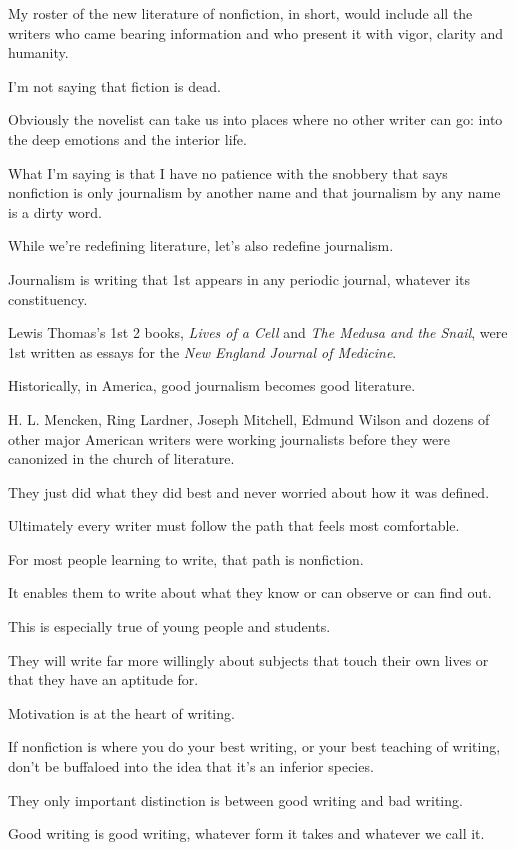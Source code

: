 \documentclass{book}
\numberwithin{equation}{section}
\begin{document}
My roster of the new literature of nonfiction, in short, would include all the writers who came bearing information and who present it with vigor, clarity and humanity.

%
I'm not saying that fiction is dead.

Obviously the novelist can take us into places where no other writer can go: into the deep emotions and the interior life.

What I'm saying is that I have no patience with the snobbery that says nonfiction is only journalism by another name and that journalism by any name is a dirty word.

While we're redefining literature, let's also redefine journalism.

Journalism is writing that 1st appears in any periodic journal, whatever its constituency.

Lewis Thomas's 1st 2 books, \textit{Lives of a Cell} and \textit{The Medusa and the Snail}, were 1st written as essays for the \textit{New England Journal of Medicine}.

Historically, in America, good journalism becomes good literature.

H. L. Mencken, Ring Lardner, Joseph Mitchell, Edmund Wilson and dozens of other major American writers were working journalists before they were canonized in the church of literature.

They just did what they did best and never worried about how it was defined.

%
Ultimately every writer must follow the path that feels most comfortable.

For most people learning to write, that path is nonfiction.

It enables them to write about what they know or can observe or can find out.

This is especially true of young people and students.

They will write far more willingly about subjects that touch their own lives or that they have an aptitude for.

Motivation is at the heart of writing.

If nonfiction is where you do your best writing, or your best teaching of writing, don't be buffaloed into the idea that it's an inferior species.

They only important distinction is between good writing and bad writing.

Good writing is good writing, whatever form it takes and whatever we call it.
\end{document}

